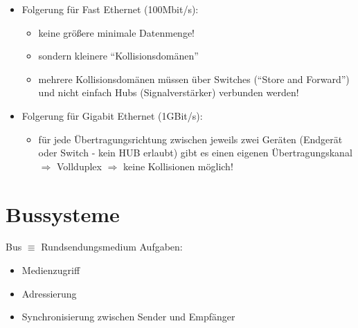 \begin{description}
\begin{itemize}
\item Folgerung für Fast Ethernet (100Mbit/s):
\begin{itemize}
\item[]keine größere minimale Datenmenge!
\item[]sondern kleinere “Kollisionsdomänen”
\item[]mehrere Kollisionsdomänen müssen über Switches (“Store and Forward”) und nicht einfach Hubs (Signalverstärker) verbunden werden!
\end{itemize}

\item Folgerung für Gigabit Ethernet (1GBit/s):
\begin{itemize}
\item[]für jede Übertragungsrichtung zwischen jeweils zwei Geräten (Endgerät oder Switch -  kein HUB erlaubt) gibt es einen eigenen Übertragungskanal $\Rightarrow$ Vollduplex $\Rightarrow$ keine Kollisionen möglich!
\end{itemize}
\end{itemize}
\end{description}

\section{Bussysteme}
Bus $\equiv$ Rundsendungsmedium
Aufgaben: 
\begin{itemize}
\item Medienzugriff
\item Adressierung
\item Synchronisierung zwischen Sender und Empfänger
\end{itemize}

